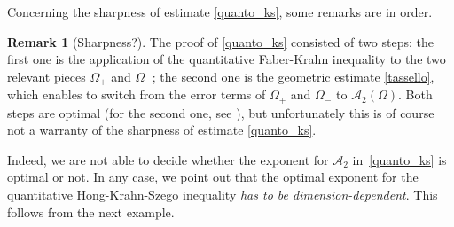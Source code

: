 \documentclass{amsart}
\theoremstyle{definition}
\newtheorem{remark}[lemma]{Remark}
\newtheorem{example}[lemma]{Example}
\numberwithin{equation}{section}
\begin{document}

Concerning the sharpness of estimate \eqref{quanto_ks}, some remarks are in order.
\begin{remark}[Sharpness?]
The proof of \eqref{quanto_ks} consisted of two steps: the first one is the application of the quantitative Faber-Krahn inequality to the two relevant pieces $\Omega_+$ and $\Omega_-$; the second one is the geometric estimate \eqref{tassello}, which enables to switch from the error terms of $\Omega_+$ and $\Omega_-$ to $\mathcal{A}_2(\Omega)$.  Both steps are optimal (for the second one, see \cite[Example 3.4]{MR2899684}), but unfortunately this is of course not a warranty of the sharpness of estimate \eqref{quanto_ks}.\par
Indeed, we are not able to decide whether the exponent for $\mathcal{A}_2$ in~\eqref{quanto_ks} is optimal or not. In any case, we point out that the optimal exponent for the quantitative Hong-Krahn-Szego inequality {\it has to be dimension-dependent}. This follows from the next example.
\end{remark}
\end{document}
